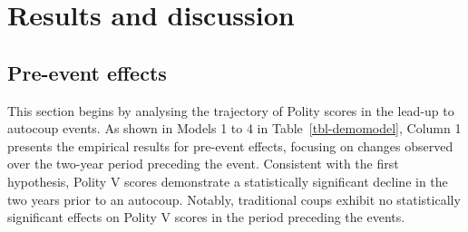 \documentclass[
  12pt,
]{report}
\begin{document}
\section{Results and discussion}\label{results-and-discussion-1}

\subsection{Pre-event effects}\label{pre-event-effects}

This section begins by analysing the trajectory of Polity scores in the
lead-up to autocoup events. As shown in Models 1 to 4 in
Table~\ref{tbl-demomodel}, Column 1 presents the empirical results for
pre-event effects, focusing on changes observed over the two-year period
preceding the event. Consistent with the first hypothesis, Polity V
scores demonstrate a statistically significant decline in the two years
prior to an autocoup. Notably, traditional coups exhibit no
statistically significant effects on Polity V scores in the period
preceding the events.
\end{document}
